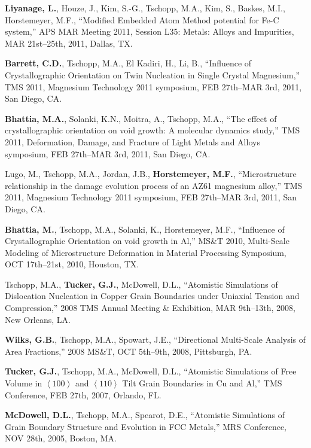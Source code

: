 \begin{cvlist}
\item
\textbf{Liyanage, L.}, Houze, J., Kim, S.-G., Tschopp, M.A., Kim, S., Baskes, M.I., Horstemeyer, M.F., ``Modified Embedded Atom Method potential for Fe-C system,'' APS MAR Meeting 2011, Session L35: Metals: Alloys and Impurities, MAR 21st--25th, 2011, Dallas, TX.

\item 
\textbf{Barrett, C.D.}, Tschopp, M.A., El Kadiri, H., Li, B., ``Influence of Crystallographic Orientation on Twin Nucleation in Single Crystal Magnesium,'' TMS 2011, Magnesium Technology 2011 symposium, FEB 27th--MAR 3rd, 2011, San Diego, CA.

\item
\textbf{Bhattia, M.A.}, Solanki, K.N., Moitra, A., Tschopp, M.A., ``The effect of crystallographic orientation on void growth: A molecular dynamics study,'' TMS 2011, Deformation, Damage, and Fracture of Light Metals and Alloys symposium, FEB 27th--MAR 3rd, 2011, San Diego, CA.

\item
Lugo, M., Tschopp, M.A., Jordan, J.B., \textbf{Horstemeyer, M.F.}, ``Microstructure relationship in the damage evolution process of an AZ61 magnesium alloy,'' TMS 2011, Magnesium Technology 2011 symposium, FEB 27th--MAR 3rd, 2011, San Diego, CA.

\item
\textbf{Bhattia, M.}, Tschopp, M.A., Solanki, K., Horstemeyer, M.F., ``Influence of Crystallographic Orientation on void growth in Al,'' MS\&T 2010, Multi-Scale Modeling of Microstructure Deformation in Material Processing Symposium, OCT 17th--21st, 2010, Houston, TX.

\item
Tschopp, M.A., \textbf{Tucker, G.J.}, McDowell, D.L., ``Atomistic Simulations of Dislocation Nucleation in Copper Grain Boundaries under Uniaxial Tension and Compression,'' 2008 TMS Annual Meeting \& Exhibition,  MAR 9th--13th, 2008, New Orleans, LA.

\item
\textbf{Wilks, G.B.}, Tschopp, M.A., Spowart, J.E., ``Directional Multi-Scale Analysis of Area Fractions,'' 2008 MS\&T, OCT 5th--9th, 2008, Pittsburgh, PA.

\item
\textbf{Tucker, G.J.}, Tschopp, M.A., McDowell, D.L., ``Atomistic Simulations of Free Volume in $\left\langle100\right\rangle$ and $\left\langle110\right\rangle$ Tilt Grain Boundaries in Cu and Al,'' TMS Conference, FEB 27th, 2007, Orlando, FL.

\item
\textbf{McDowell, D.L.}, Tschopp, M.A., Spearot, D.E.,  ``Atomistic Simulations of Grain Boundary Structure and Evolution in FCC Metals,''  MRS Conference, NOV 28th, 2005, Boston, MA.

\end{cvlist}

